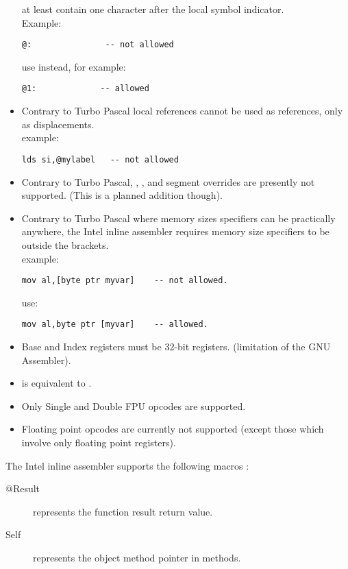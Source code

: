 \documentclass{report}
\begin{document}
\begin{itemize}
at least contain one character after the local symbol indicator.\\
Example:
\begin{verbatim}
@:               -- not allowed
\end{verbatim}
  use instead, for example:
\begin{verbatim}
@1:             -- allowed
\end{verbatim}
\item  Contrary to Turbo Pascal local references cannot be used as references,
   only as displacements. \\   example:
\begin{verbatim}
lds si,@mylabel   -- not allowed
\end{verbatim}
\item  Contrary to Turbo Pascal, , ,  and
 segment overrides are presently not supported.
   (This is a planned addition though).
\item  Contrary to Turbo Pascal where memory sizes specifiers can
   be practically anywhere, the \fpc Intel inline assembler requires
   memory size specifiers to be outside the brackets. \\
      example:
\begin{verbatim}
mov al,[byte ptr myvar]    -- not allowed.
\end{verbatim}
 use:
\begin{verbatim}
mov al,byte ptr [myvar]    -- allowed.
\end{verbatim}
\item  Base and Index registers must be 32-bit registers.
     (limitation of the GNU Assembler).
\item  {} is equivalent to .
\item  Only Single and Double FPU opcodes are supported.
\item  Floating point opcodes are currently not supported
   (except those which involve only floating point registers).
\end{itemize}

The Intel inline assembler supports the following macros :
\begin{description}
\item [@Result] represents the function result return value.
\item [Self] represents the object method pointer in methods.
\end{description}

\end{document}
